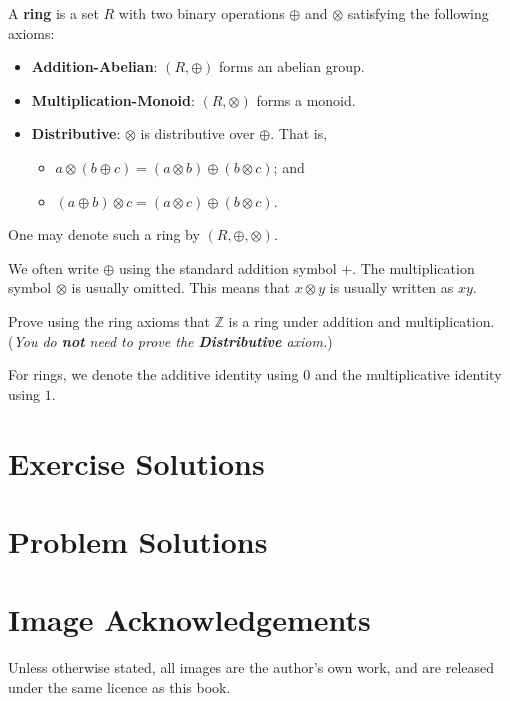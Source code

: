 \begin{definition}
    A \textbf{ring} is a set $R$ with two binary operations $\oplus$ and $\otimes$ satisfying the following axioms:
    \begin{itemize}
        \item \textbf{Addition-Abelian}: $(R, \oplus)$ forms an abelian group.
        \item \textbf{Multiplication-Monoid}: $(R, \otimes)$ forms a monoid.
        \item \textbf{Distributive}: $\otimes$ is distributive over $\oplus$. That is,
        \begin{itemize}
            \item $a \otimes (b \oplus c) = (a \otimes b) \oplus (b \otimes c)$; and
            \item $(a \oplus b) \otimes c = (a \otimes c) \oplus (b \otimes c)$.
        \end{itemize}
    \end{itemize}
    One may denote such a ring by $(R, \oplus, \otimes)$.
\end{definition}
\begin{remark}
    We often write $\oplus$ using the standard addition symbol $+$. The multiplication symbol $\otimes$ is usually omitted. This means that $x \otimes y$ is usually written as $xy$.
\end{remark}


\begin{exercise}
    Prove using the ring axioms that $\mathbb{Z}$ is a ring under addition and multiplication.\newline
    (\textit{You do \textbf{not} need to prove the \textbf{Distributive} axiom.})
\end{exercise}

For rings, we denote the additive identity using $0$ and the multiplicative identity using $1$.

\appendix
\chapter{Exercise Solutions}

\chapter{Problem Solutions}

\chapter{Image Acknowledgements}
Unless otherwise stated, all images are the author's own work, and are released under the same licence as this book.

\printbibliography[heading=bibintoc, title={References and Bibliography}]



